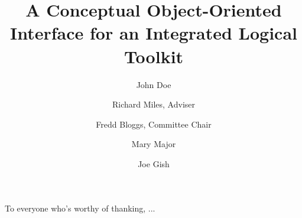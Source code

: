 \documentclass[10pt,letterpaper,openany]{book}
\author{John Doe}
\title{A Conceptual Object-Oriented Interface for an Integrated Logical Toolkit}
\begin{document}
\maketitle
\copyrightpage

\frontmatter



\begin{signatures}
  \signature[Richard Miles]{Richard Miles, Adviser}
  \signature[Fred Bloggs]{Fredd Bloggs, Committee Chair}
  \signature[Mary Major]{Mary Major}
  \signature[Joe Gish]{Joe Gish}
  
\end{signatures}

\dedication{To everyone who's helped me succeed}

\begin{acknowledgments}
  To everyone who's worthy of thanking, ...
\end{acknowledgments}

\tableofcontents

\mainmatter








\backmatter

\nocite{*}

\end{document}
